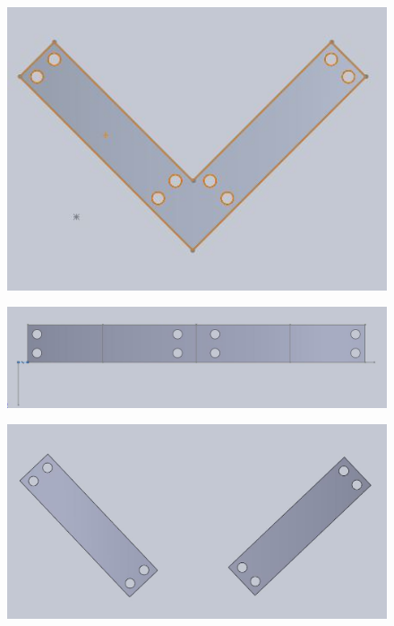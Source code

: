 \documentclass[letterpaper,12pt]{article}
\begin{document}
\begin{figure}[!htbp]\centering
\begin{minipage}{.5\textwidth}\centering
\includegraphics[width=.8\textwidth]{single-v.JPG}
\label{singlev}
\end{minipage}
\end{figure}

\begin{figure}[!htbp]\centering
\begin{minipage}{.5\textwidth}\centering
\includegraphics[width=.8\textwidth]{single-bar.JPG}
\label{singlebar}
\end{minipage}
\end{figure}

\begin{figure}[!htbp]\centering
\begin{minipage}{.5\textwidth}\centering
\includegraphics[width=.8\textwidth]{single-accent.JPG}
\label{single-accent}
\end{minipage}
\end{figure}
\end{document}

